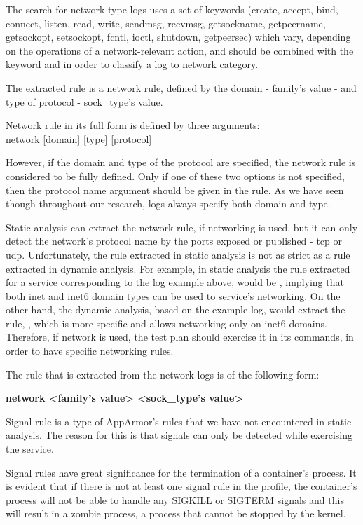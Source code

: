 \begin{description}[style=nextline]
The search for network type logs uses a set of keywords (create, accept, bind, connect, listen, read, write, sendmsg, recvmsg, getsockname, getpeername, getsockopt, setsockopt, fcntl, ioctl, shutdown, getpeersec) which vary, depending on the operations of a network-relevant action, and should be combined with the keyword  and  in order to classify a log to network category.

The extracted rule is a network rule, defined by the domain - family's value - and type of protocol - sock\_type's value.

Network rule in its full form is defined by three arguments:\\network [domain] [type] [protocol]

However, if the domain and type of the protocol are specified, the network rule is considered to be fully defined. Only if one of these two options is not specified, then the protocol name argument should be given in the rule. As we have seen though throughout our research, logs always specify both domain and type.

Static analysis can extract the network rule, if networking is used, but it can only detect the network's protocol name by the ports exposed or published - tcp or udp. Unfortunately, the rule extracted in static analysis is not as strict as a rule extracted in dynamic analysis. For example, in static analysis the rule extracted for a service corresponding to the log example above, would be , implying that both inet and inet6 domain types can be used to service's networking. On the other hand, the dynamic analysis, based on the example log, would extract the rule, , which is more specific and allows networking only on inet6 domains. Therefore, if network is used, the test plan should exercise it in its commands, in order to have specific networking rules.

The rule that is extracted from the network logs is of the following form:

\textbf{network \textless family's value\textgreater{} \textless sock\_type's value\textgreater}

\item[Signal]
Signal rule is a type of AppArmor's rules that we have not encountered in static analysis. The reason for this is that signals can only be detected while exercising the service. 

Signal rules have great significance for the termination of a container's process. It is evident that if there is not at least one signal rule in the profile, the container's process will not be able to handle any SIGKILL or SIGTERM signals and this will result in a zombie process, a process that cannot be stopped by the kernel. 
 

\end{description}
